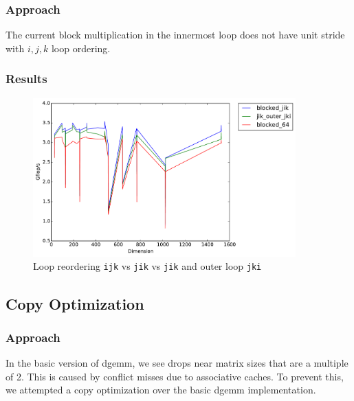 \documentclass[11pt]{article}
\begin{document}
\subsubsection{Approach}
The current block multiplication in the innermost loop does not have unit stride with $i, j, k$ loop ordering. 
\subsubsection{Results}

\begin{figure}[H]
    \includegraphics[width=0.9\textwidth]{timing_loop_reorder_fast.pdf}
    \caption{Loop reordering \texttt{ijk} vs \texttt{jik} vs \texttt{jik} and outer loop \texttt{jki}}
    \label{basic_copy_opt}
\end{figure} 

\subsection{Copy Optimization}
\subsubsection{Approach}
In the basic version of dgemm, we see drops near matrix sizes that are a multiple of 2. This is caused by conflict misses due to associative caches. To prevent this, we attempted a copy optimization over the basic dgemm implementation.
\end{document}
